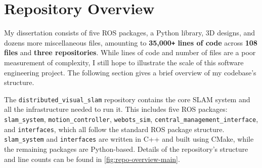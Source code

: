 \newpage
\section{Repository Overview}
\label{sec:repository-overview}

\newcommand{\locindent}{3.3em}
\newcommand{\locsmallindent}{2em}
\newcommand{\locdiff}[3]{
    \makebox[#3][r]{\textcolor{PineGreen}{\texttt{+#1}}}
    \makebox[#3][r]{\textcolor{BrickRed}{\texttt{-#2}}}
}
\newcommand{\locadd}[2]{
    \makebox[#2][r]{\textcolor{PineGreen}{\texttt{+#1}}}
    \makebox[#2][r]{}
}
\newcommand{\locaddnospace}[2]{
    \makebox[#2][r]{\textcolor{PineGreen}{\texttt{+#1}}}
}
\newcommand{\locdoublespace}[1]{
    \makebox[#1][r]{}
    \makebox[#1][r]{}
}
\newcommand{\locsinglespace}[1]{
    \makebox[#1][r]{}
}

My dissertation consists of five ROS packages, a Python library, 3D designs, and dozens more miscellaneous files, amounting to \textbf{35,000\texttt{+} lines of code} across \textbf{108 files} and \textbf{three repositories}. While lines of code and number of files are a poor measurement of complexity, I still hope to illustrate the scale of this software engineering project. The following section gives a brief overview of my codebase's structure.

The \texttt{distributed\_visual\_slam} repository contains the core SLAM system and all the infrastructure needed to run it. This includes five ROS packages: \texttt{slam\_system}, \texttt{motion\_controller}, \texttt{webots\_sim}, \texttt{central\_management\_interface}, and \texttt{interfaces}, which all follow the standard ROS package structure. \texttt{slam\_system} and \texttt{interfaces} are written in C++ and built using CMake, while the remaining packages are Python-based. Details of the repository's structure and line counts can be found in \autoref{fig:repo-overview-main}.

